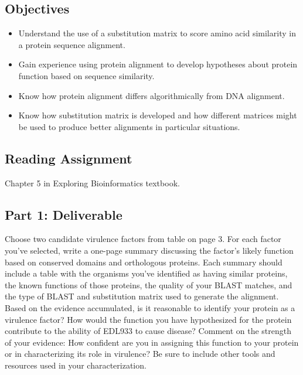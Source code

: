 

\long{}



\vspace*{-.1in}
\subsection*{Objectives}
\vspace*{-.1in}

\begin{itemize}
	\item Understand the use of a substitution matrix to score amino acid similarity in a protein sequence alignment.
	\item Gain experience using protein alignment to develop hypotheses about protein function based on sequence similarity.  
	\item Know how protein alignment differs algorithmically from DNA alignment.
	\item Know how substitution matrix is developed and how different matrices might be used to produce better alignments in particular situations.

\end{itemize}

\vspace*{-.1in}
\subsection*{Reading Assignment}
\vspace*{-.1in}
Chapter 5 in Exploring Bioinformatics textbook.

\vspace*{-.1in}
\subsection*{Part 1: Deliverable}
\vspace*{-.1in} 

Choose two candidate virulence factors from table on page 3.  For each factor you’ve selected, write a one-page summary discussing the factor’s likely function based on conserved domains and orthologous proteins.  Each summary should include a table with the organisms you’ve identified as having similar proteins, the known functions of those proteins, the quality of your BLAST matches, and the type of BLAST and substitution matrix used to generate the alignment.  Based on the evidence accumulated, is it reasonable to identify your protein as a virulence factor?  How would the function you have hypothesized for the protein contribute to the ability of EDL933 to cause disease?  Comment on the strength of your evidence:  How confident are you in assigning this function to your protein or in characterizing its role in virulence?  Be sure to include other tools and resources used in your characterization.


